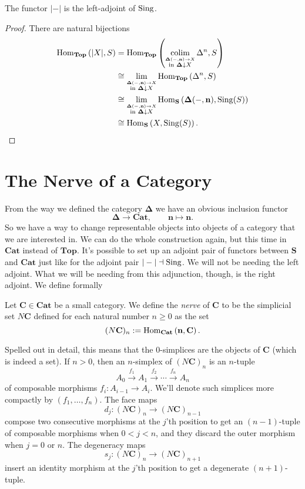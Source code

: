 \begin{theorem}
The functor $|-|$ is the left-adjoint of $\operatorname{Sing}$.
\end{theorem}
\begin{proof}
There are natural bijections
\begin{align*}
\operatorname{Hom}_{\mathbf{Top}}\left(|X|, S \right) &= \operatorname{Hom}_{\mathbf{Top}}\left( \operatorname*{colim}_{\stackrel{\mathbf{\Delta}(-,\mathbf{n}) \to X}{\text{in } \mathbf{\Delta}\downarrow X}} \Delta^n, S \right) \\
&\cong \lim_{\stackrel{\mathbf{\Delta}(-,\mathbf{n}) \to X}{\text{in } \mathbf{\Delta}\downarrow X}} \operatorname{Hom}_{\mathbf{Top}}\left( \Delta^n, S \right) \\
&\cong \lim_{\stackrel{\mathbf{\Delta}(-,\mathbf{n}) \to X}{\text{in } \mathbf{\Delta}\downarrow X}} \operatorname{Hom}_{\mathbf{S}}\left( \mathbf{\Delta}(-,\mathbf{n}), \operatorname{Sing}(S) \right) \\
&\cong \operatorname{Hom}_{\mathbf{S}}\left(X, \operatorname{Sing}(S) \right).
\end{align*}
\end{proof}

\section{The Nerve of a Category}
From the way we defined the category $\mathbf{\Delta}$ we have an obvious inclusion functor
\[ \mathbf{\Delta} \to \mathbf{Cat}, \qquad \mathbf{n} \mapsto \mathbf{n}. \]
So we have a way to change representable objects into objects of a category that we are interested in. We can do the whole construction again, but this time in $\mathbf{Cat}$ instead of $\mathbf{Top}$. It's possible to set up an adjoint pair of functors between $\mathbf{S}$ and $\mathbf{Cat}$ just like for the adjoint pair $|-| \dashv \operatorname{Sing}$. We will not be needing the left adjoint. What we will be needing from this adjunction, though, is the right adjoint. We define formally
\begin{definition}
\label{def:nerve of a category}
Let $\mathbf{C} \in \mathbf{Cat}$ be a small category. We define the \emph{nerve} of $\mathbf{C}$ to be the simplicial set $N\mathbf{C}$ defined for each natural number $n \geq 0$ as the set
\[ (N\mathbf{C})_n := \operatorname{Hom}_{\mathbf{Cat}}\left(\mathbf{n}, \mathbf{C} \right). \]
\end{definition}
Spelled out in detail, this means that the $0$-simplices are the objects of $\mathbf{C}$ (which is indeed a set). If $n>0$, then an $n$-simplex of $(N\mathbf{C})_n$ is an $n$-tuple
\[ A_0 \xrightarrow{f_1} A_1 \xrightarrow{f_2} \cdots \xrightarrow{f_n} A_n \]
of composable morphisms $f_i : A_{i-1} \to A_i$. We'll denote such simplices more compactly by $(f_1,\ldots,f_n)$. The face maps
\[ d_j : (N\mathbf{C})_{n} \to (N\mathbf{C})_{n-1} \] compose two consecutive morphisms at the $j$'th position to get an $(n-1)$-tuple of composable morphisms when $0 < j < n$, and they discard the outer morphism when $j = 0$ or $n$. The degeneracy maps
\[ s_j : (N\mathbf{C})_n \to (N \mathbf{C})_{n+1} \]
insert an identity morphism at the $j$'th position to get a degenerate $(n+1)$-tuple.

